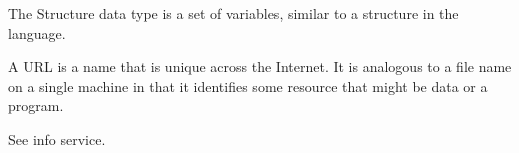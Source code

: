
The Structure data type is a set of variables, similar to a structure
in the language.


A URL is a name that is unique across the Internet. It is analogous to
a file name on a single machine in that it identifies some resource
that might be data or a program.


See info service.







